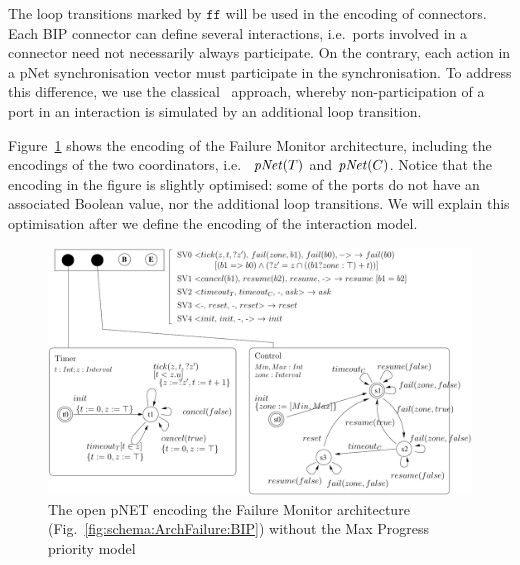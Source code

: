 \documentclass{llncs}
\newcommand{\Simon}{\\\hfill\mdash Simon}
\newcommand{\noteSBin}[2][inline,color=green!40]{\todo[#1]{{#2}\Simon}}
\newcommand{\fig}[1]{Fig.~\ref{fig:#1}}
\newcommand{\Fig}[1]{Figure~\ref{fig:#1}}
\newcommand{\mdash}[1][]{---#1}
\newcommand{\ie}[1][\ ]{i.e.#1}
\newcommand{\eg}[1][\ ]{e.g.#1}
\newcommand{\false}{\ensuremath{\mathtt{f\!f}}}
\newcommand{\nopri}[1][]{\ensuremath{\mathit{pNet}%
    \ifx#1\relax\else(#1)\fi}}
\begin{document}
The loop transitions marked by $\false$ will be used in the encoding
of connectors.  Each BIP connector can define several interactions,
\ie ports involved in a connector need not necessarily always
participate.  On the contrary, each action in a pNet synchronisation
vector must participate in the synchronisation.  To address this
difference, we use the classical~\cite{milner83-calculi} approach,
whereby non-participation of a port in an interaction is simulated
by an additional loop transition.

\Fig{FailureTimer:pNet} shows the encoding of the Failure Monitor
architecture, including the encodings of the two coordinators, \ie
$\nopri[\NameTimer]$ and $\nopri[\NameCtrl]$.  Notice that the
encoding in the figure is slightly optimised: some of the ports do not
have an associated Boolean value, nor the additional loop transitions.
We will explain this optimisation after we define the
encoding of the interaction model.

\begin{figure}[t]
  \centering
  \includegraphics[width=0.9\columnwidth]{FailureTimerPNET-v4}
  \caption{The open pNET encoding the Failure Monitor architecture (\fig{schema:ArchFailure:BIP}) without the Max Progress priority model}
  \label{fig:FailureTimer:pNet}
%
\end{figure}

\end{document}

